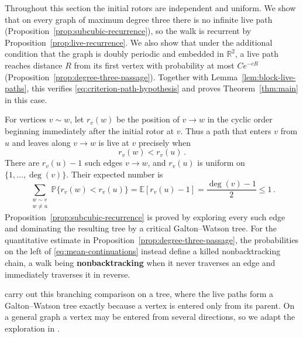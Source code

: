 \documentclass[11pt]{amsart}
\theoremstyle{plain}
\theoremstyle{definition}
\newcommand{\R}{\mathbb R}
\renewcommand{\P}{\mathbb P}
\newcommand{\E}{\mathbb E}
\newcommand{\defn}[1]{\textbf{#1}}
\begin{document}
	Throughout this section the initial rotors are independent and uniform.  We
	show that on every graph of maximum degree three there is no infinite live
	path (Proposition~\ref{prop:subcubic-recurrence}), so the walk is recurrent by
	Proposition~\ref{prop:live-recurrence}.  We also show that under the additional condition that the graph is doubly periodic and
	embedded in $\R^2$, a live path reaches distance $R$ from its first vertex with
	probability at most $Ce^{-cR}$
	(Proposition~\ref{prop:degree-three-passage}).  Together with
	Lemma~\ref{lem:block-live-paths}, this verifies
	\eqref{eq:criterion-path-hypothesis} and proves Theorem~\ref{thm:main} in this case. 
	
	
	For vertices $v\sim w$, let $r_v(w)$ be the position of $v\to w$ in the
	cyclic order beginning immediately after the initial rotor at $v$.  Thus a
	path that enters $v$ from $u$ and leaves along $v\to w$ is live at $v$
	precisely when
	\[
	r_v(w)<r_v(u)\, .
	\]
	There are $r_v(u)-1$ such edges $v\to w$, and $r_v(u)$ is uniform on
	$\{1,\ldots,\deg(v)\}$.  Their expected number is
	\begin{equation}\label{eq:mean-continuations}
		\sum_{\substack{w\sim v\\ w\ne u}}\P\{r_v(w)<r_v(u)\}
		=\E[r_v(u)-1]
		=\frac{\deg(v)-1}{2}
		\leq1\, .
	\end{equation}
	Proposition~\ref{prop:subcubic-recurrence} is proved by exploring every such
	edge and dominating the resulting tree by a critical Galton--Watson tree.  For
	the quantitative estimate in Proposition~\ref{prop:degree-three-passage}, the
	probabilities on the left of \eqref{eq:mean-continuations} instead define a
	killed nonbacktracking chain, a walk being \defn{nonbacktracking} when it
	never traverses an edge and immediately traverses it in reverse.
	
	\citet[proof of Theorem~6\textup{(ii)}]{AngelHolroyd2011} carry out this
	branching comparison on a tree, where the live paths form a Galton--Watson tree
	exactly because a vertex is entered only from its parent.  On a general graph a
	vertex may be entered from several directions, so we adapt the exploration in
	\citet[proof of Theorem~1]{BenjaminiSchramm1996}.
\end{document}
